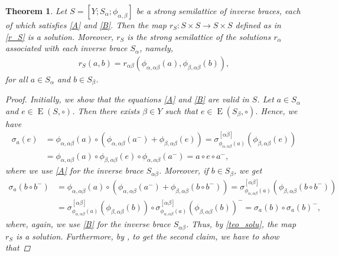 \documentclass[preprint,1p]{elsarticle}
\newtheorem{theor}{Theorem}[section]
\theoremstyle{definition}               %
\DeclareMathOperator{\E}{E}
\newcommand{\phii}[2]{\phi_{#1,#2}}
\begin{document}
\smallskip

\begin{theor}\label{teo_solu_semil}
 Let  $S=[Y; S_\alpha;\phii{\alpha}{\beta}]$ be a strong semilattice of inverse braces, each of which satisfies \eqref{A} and \eqref{B}. Then the map $r_S:S \times S \to S  \times S$ defined as in \eqref{r_S} is a solution. Moreover, $r_S$ is the strong semilattice of the solutions $r_\alpha$ associated with each inverse brace $S_\alpha$, namely,
     	\begin{align}\label{solu_semil}
		r_S\left(a, b\right)= 
		r_{\alpha\beta}\left(\phi_{\alpha,\alpha\beta}\left(a\right),
		\phi_{\beta, \alpha\beta}\left(b\right) \right),
	\end{align}	
    for all $a\in S_{\alpha}$ and $b\in S_{\beta}$.
    \begin{proof}
        Initially, we show that the equations \eqref{A} and \eqref{B} are valid in $S$. Let $a \in S_\alpha$ and $e \in \E\left(S, \circ \right)$. Then there exists $\beta \in Y$ such that $e \in \E\left(S_\beta, \circ \right)$. Hence,  we have
        \begin{align*}
            \sigma_a(e)&=\phii{\alpha}{\alpha\beta}(a) \circ \left(\phii{\alpha}{\alpha\beta}(a^-)+\phii{\beta}{\alpha\beta}(e)\right)=\sigma^{[\alpha\beta]}_{\phii{\alpha}{\alpha\beta}(a)}\left(\phii{\beta}{\alpha\beta}(e)\right)\\
            &=\phii{\alpha}{\alpha\beta}(a)  \circ \phii{\beta}{\alpha\beta}(e) \circ \phii{\alpha}{\alpha\beta}(a^-) =a \circ e \circ a^-,
        \end{align*}
       where we use \eqref{A} for the inverse brace $S_{\alpha\beta}$. Moreover, if $b \in S_\beta$, we get
        \begin{align*}
           \sigma_a\left( b \circ b^-\right)&=\phii{\alpha}{\alpha\beta}(a) \circ \left(\phii{\alpha}{\alpha\beta}(a^-)+\phii{\beta}{\alpha\beta}\left(b \circ b^-\right)\right)=\sigma^{[\alpha\beta]}_{\phii{\alpha}{\alpha\beta}(a)}\left(\phii{\beta}{\alpha\beta}\left(b \circ b^-\right)\right)\\
           &=\sigma^{[\alpha\beta]}_{\phii{\alpha}{\alpha\beta}(a)}\left(\phii{\beta}{\alpha\beta}(b)\right) \circ \sigma^{[\alpha\beta]}_{\phii{\alpha}{\alpha\beta}(a)}\left(\phii{\beta}{\alpha\beta}(b)\right)^-=\sigma_a(b) \circ \sigma_a(b)^-,
        \end{align*}
       where, again, we use \eqref{B} for the inverse brace $S_{\alpha\beta}$.
        Thus, by \cref{teo_solu}, the map $r_S$ is a solution. Furthermore, by \cite[Theorem 4.1]{CCoSt20x-2}, to get the second claim, we have to show that

\end{proof}
\end{theor}
\end{document}

